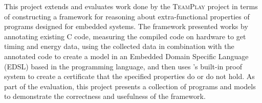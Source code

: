 This project extends and evaluates work done by the \textsc{TeamPlay} \cite{teamplay:d1.1} project in terms of constructing a framework for reasoning about extra-functional properties of programs designed for embedded systems. The framework presented works by annotating existing C code, measuring the compiled code on hardware to get timing and energy data, using the collected data in combination with the annotated code to create a model in an Embedded Domain Specific Language (EDSL) based in the \Idris programming language, and then uses \Idris's built-in proof system to create a certificate that the specified properties do or do not hold. As part of the evaluation, this project presents a collection of programs and models to demonstrate the correctness and usefulness of the framework.
